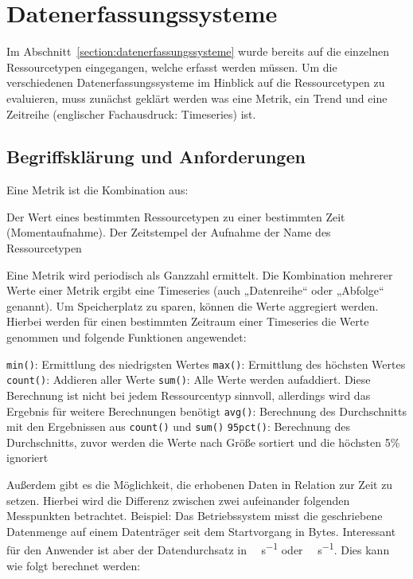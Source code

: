 \section{Datenerfassungssysteme}
Im Abschnitt~\ref{section:datenerfassungssysteme} wurde bereits auf die
einzelnen Ressourcetypen eingegangen, welche erfasst werden müssen. Um die
verschiedenen Datenerfassungssysteme im Hinblick auf die Ressourcetypen zu
evaluieren, muss zunächst geklärt werden was eine Metrik, ein Trend und eine
Zeitreihe (englischer Fachausdruck: Timeseries) ist.
\tm%

\subsection{Begriffsklärung und Anforderungen}
\label{section:Begriffserklärung}
Eine Metrik ist die Kombination aus:

\begin{outline}
  \1 Der Wert eines bestimmten Ressourcetypen zu einer bestimmten Zeit
  (Momentaufnahme).
  \1 Der Zeitstempel der Aufnahme
  \1 der Name des Ressourcetypen
\end{outline}

Eine Metrik wird periodisch als Ganzzahl ermittelt. Die Kombination mehrerer
Werte einer Metrik ergibt eine Timeseries (auch „Datenreihe“ oder „Abfolge“
genannt). Um Speicherplatz zu sparen, können die Werte aggregiert werden.
Hierbei werden für einen bestimmten Zeitraum einer Timeseries die Werte
genommen und folgende Funktionen angewendet:

\begin{outline}
  \1 \lstinline|min()|: Ermittlung des niedrigsten Wertes
  \1 \lstinline|max()|: Ermittlung des höchsten Wertes
  \1 \lstinline|count()|: Addieren aller Werte
  \1 \lstinline|sum()|: Alle Werte werden aufaddiert. Diese Berechnung ist
  nicht bei jedem Ressourcentyp sinnvoll, allerdings wird das Ergebnis für
  weitere Berechnungen benötigt
  \1 \lstinline|avg()|: Berechnung des Durchschnitts mit den Ergebnissen aus
  \lstinline|count()| und \lstinline|sum()|
  \1 \lstinline|95pct()|: Berechnung des Durchschnitts, zuvor werden die Werte
  nach Größe sortiert und die höchsten 5\% ignoriert
\end{outline}

Außerdem gibt es die Möglichkeit, die erhobenen Daten in Relation zur Zeit zu
setzen. Hierbei wird die Differenz zwischen zwei aufeinander folgenden
Messpunkten betrachtet.  Beispiel: Das Betriebssystem misst die geschriebene
Datenmenge auf einem Datenträger seit dem Startvorgang in Bytes. Interessant
für den Anwender ist aber der Datendurchsatz in \si{\mega\byte\per\second} oder
\si{\giga\byte\per\second}. Dies kann wie folgt berechnet werden:

